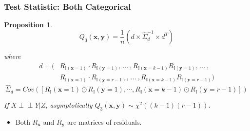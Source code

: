 \documentclass{beamer}
\def\ci{\perp\!\!\!\!\!\perp}
\newtheorem{proposition}{Proposition}
\begin{document}
\begin{frame}
	\frametitle{Test Statistic: Both Categorical}
	\begin{proposition}

	$$ Q_3(\bm{x}, \bm{y}) = \frac{1}{n} (d \times \hat{\Sigma}_d^{-1} \times d^T) $$

	where
	\begin{equation*}
		\begin{split}
		d = (&R_{\mathbb{I}(\mathbf{x}=1)} \cdot R_{\mathbb{I}(\mathbf{y}=1)}, \, \ldots \ ,
				R_{\mathbb{I}(\mathbf{x}=k-1)} R_{\mathbb{I}(\mathbf{y}=1)}, \, \ldots \, , \\
		     &R_{\mathbb{I}(\mathbf{x}=1)} \cdot R_{\mathbb{I}(\mathbf{y}=r-1)}, \, \ldots \ ,
				R_{\mathbb{I}(\mathbf{x}=k-1)} R_{\mathbb{I}(\mathbf{y}=r-1)}) 
		\end{split}
	\end{equation*}
	\begin{equation*}
		\hat{\Sigma}_d = Cov([R_\mathbb{I}(\mathbf{x}=1) \odot R_\mathbb{I}(\mathbf{y}=1), \cdots, R_\mathbb{I}(\mathbf{x}=k-1) \odot R_\mathbb{I}(\mathbf{y}=r-1)])
	\end{equation*}

	If $ X \ci Y | Z $, asymptotically $ Q_3(\bm{x}, \bm{y}) \sim \chi^2((k-1)(r-1)) $.
	\end{proposition}
	\begin{center}
		\begin{itemize}
			\item Both $ R_{\bm{x}} $ and $ R_{\bm{y}} $ are matrices of residuals.
		\end{itemize}
	\end{center}

\end{frame}
\end{document}
